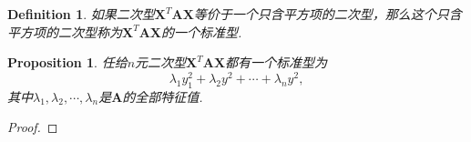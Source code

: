 \documentclass{article}
\newtheorem{proposition}[theorem]{Proposition}
\newtheorem{definition}[theorem]{Definition}
\newcommand{\mbf}[1]{\bm{#1}}
\begin{document}
\begin{definition}
\rm 如果二次型$\mbf{X}^T\mbf{A}\mbf{X}$等价于一个只含平方项的二次型，那么这个只含平方项的二次型称为$\mbf{X}^T\mbf{A}\mbf{X}$的一个{\color{red}标准型}.
\end{definition}

\begin{proposition}
\rm 任给$n$元二次型$\mbf{X}^T\mbf{A}\mbf{X}$都有一个标准型为
$$
\lambda_1y_1^2 + \lambda_2y^2 + \cdots + \lambda_n y^2,
$$
其中$\lambda_1,\lambda_2,\cdots,\lambda_n$是$\mbf{A}$的全部特征值. 
\end{proposition}

\begin{proof}

\end{proof}
\end{document}
